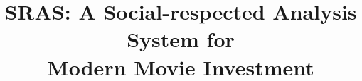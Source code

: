 \documentclass[sigconf]{acmart}
\begin{document}
\title[SRAS: A  Social-respected Analysis System for Modern Movie Investment]{SRAS: A  Social-respected Analysis System for \\ Modern Movie Investment}

\maketitle











\end{document}
